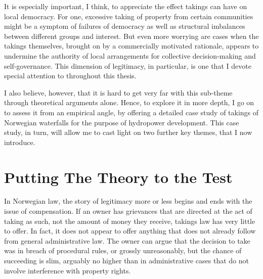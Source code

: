 {It is especially important, I think, to appreciate the effect takings can have on local democracy. For one, excessive taking of property from certain communities might be a symptom of failures of democracy as well as structural imbalances between different groups and interest. But even more worrying are cases when the takings themselves, brought on by a commercially motivated rationale, appears to undermine the authority of local arrangements for collective decision-making and self-governance. This dimension of legitimacy, in particular, is one that I devote special attention to throughout this thesis.

I also believe, however, that it is hard to get very far with this sub-theme through theoretical arguments alone. Hence, to explore it in more depth, I go on to assess it from an empirical angle, by offering a detailed case study of takings of Norwegian waterfalls for the purpose of hydropower development. This case study, in turn, will allow me to cast light on two further key themes, that I now introduce. %
}

\section{Putting The Theory to the Test}\label{sec:1:3}


In Norwegian law, the story of legitimacy more or less begins and ends with the issue of compensation. If an owner has grievances that are directed at the act of taking as such, not the amount of money they receive, takings law has very little to offer. In fact, it does not appear to offer anything that does not already follow from general administrative law. The owner can argue that the decision to take was in breach of procedural rules, or grossly unreasonably, but the chance of succeeding is slim, arguably no higher than in administrative cases that do not involve interference with property rights.

